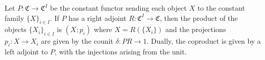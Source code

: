 Let $P: \mathfrak{C} \to \mathfrak{C}^I$ be the constant functor sending each object $X$ to the constant family $\{X\}_{i \in I}$. If $P$ has a right adjoint $R: \mathfrak{C}^I \to \mathfrak{C}$, then the product of the objects $\{X_i\}_{i \in I}$ is $(X; p_i)$ where $X = R(\{X_i\})$ and the projections $p_i: X \to X_i$ are given by the counit $\delta: PR \to 1$. Dually, the coproduct is given by a left adjoint to $P$, with the injections arising from the unit.
